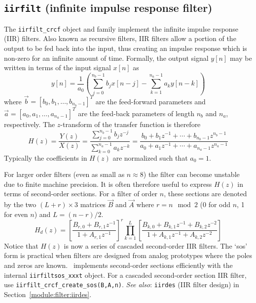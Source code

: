 % 
%
\subsection{{\tt iirfilt} (infinite impulse response filter)}
\label{module:filter:iirfilt}
The {\tt iirfilt\_crcf} object and family implement the infinite impulse
response (IIR) filters.
Also known as recursive filters, IIR filters allow a portion of the output to
be fed back into the input, thus creating an impulse response which is
non-zero for an infinite amount of time.
Formally, the output signal $y[n]$ may be written in terms of the input signal
$x[n]$ as
%
\begin{equation}
\label{eqn:filter:iirfilt:y}
    y[n] = \frac{1}{a_0} \left(
           \sum_{j=0}^{n_b-1}{ b_j x[n-j] } -
           \sum_{k=1}^{n_a-1}{ a_k y[n-k] }
           \right)
\end{equation}
%
where $\vec{b} = [b_0,b_1,\ldots,b_{n_b-1}]^T$ are the feed-forward parameters
and   $\vec{a} = [a_0,a_1,\ldots,a_{n_a-1}]^T$ are the feed-back parameters
of length $n_b$ and $n_a$, respectively.
The $z$-transform of the transfer function is therefore
%
\begin{equation}
\label{eqn:filter:iirfilt:Hz}
    H(z) = \frac{Y(z)}{X(z)}
         = \frac{\sum\limits_{j=0}^{n_b-1}{b_j z^{-j}}}
                {\sum\limits_{k=0}^{n_a-1}{a_k z^{-k}}}
         = \frac{ b_0 + b_1 z^{-1} + \cdots + b_{n_b-1} z^{n_b-1}}
                { a_0 + a_1 z^{-1} + \cdots + a_{n_a-1} z^{n_a-1}}
\end{equation}
%
Typically the coefficients in $H(z)$ are normalized such that $a_0=1$.

For larger order filters (even as small as $n\approx 8$) the filter can become
unstable due to finite machine precision.
It is often therefore useful to express $H(z)$ in terms of second-order
sections.
For a filter of order $n$, these sections are denoted by the two
$(L+r)\times 3$ matrices $\vec{B}$ and $\vec{A}$
where $r=n \mod 2$ (0 for odd $n$, 1 for even $n$) and $L=(n-r)/2$.
%
\begin{equation}
\label{eqn:filter:iirfilt:Hdz}
    H_d(z) = 
             \left[
                \frac{B_{r,0} + B_{r,1}z^{-1}}
                     {1       + A_{r,1}z^{-1}}
             \right]^r
             \prod_{k=1}^{L} {\left[
                \frac{B_{k,0} + B_{k,1}z^{-1} + B_{k,2}z^{-2}}
                     {1       + A_{k,1}z^{-1} + A_{k,2}z^{-2}}
             \right]}
\end{equation}
%
Notice that $H(z)$ is now a series of cascaded second-order IIR filters.
The `sos' form is practical when filters are designed from analog prototypes
where the poles and zeros are known.
\liquid\ implements second-order sections efficiently with the internal
{\tt iirfiltsos\_xxxt} object.
For a cascaded second-order section IIR filter, use
{\tt iirfilt\_crcf\_create\_sos(B,A,n)}.
%
{\em See also}: {\tt iirdes} (IIR filter design) in
Section~\ref{module:filter:iirdes}.

